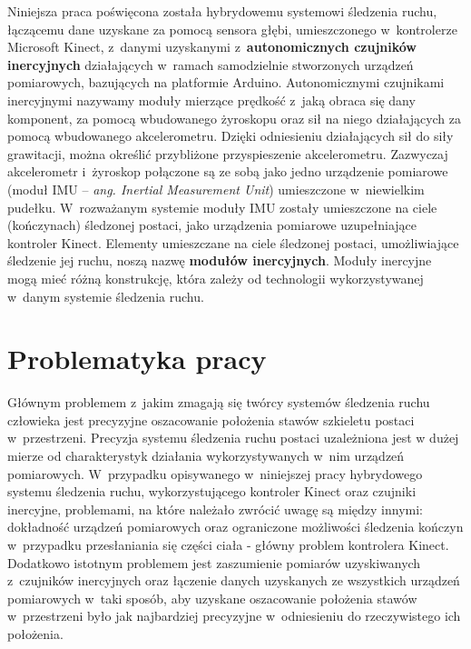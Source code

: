 Niniejsza praca poświęcona została hybrydowemu systemowi śledzenia ruchu, łączącemu dane uzyskane za pomocą sensora głębi, umieszczonego w~kontrolerze Microsoft Kinect, z~danymi uzyskanymi z~\textbf{autonomicznych czujników inercyjnych} działających w~ramach samodzielnie stworzonych urządzeń pomiarowych, bazujących na platformie Arduino. Autonomicznymi czujnikami inercyjnymi nazywamy moduły mierzące prędkość z~jaką obraca się dany komponent, za pomocą wbudowanego żyroskopu oraz sił na niego działających za pomocą wbudowanego akcelerometru. Dzięki odniesieniu działających sił do siły grawitacji, można określić przybliżone przyspieszenie akcelerometru.
Zazwyczaj akcelerometr i~żyroskop połączone są ze sobą jako jedno urządzenie pomiarowe (moduł IMU -- \emph{ang. Inertial Measurement Unit}) umieszczone w~niewielkim pudełku. W~rozważanym systemie moduły IMU zostały umieszczone na ciele (kończynach) śledzonej postaci, jako urządzenia pomiarowe uzupełniające kontroler Kinect. Elementy umieszczane na ciele śledzonej postaci, umożliwiające śledzenie jej ruchu, noszą nazwę \textbf{modułów inercyjnych}. Moduły inercyjne mogą mieć różną konstrukcję, która zależy od technologii wykorzystywanej w~danym systemie śledzenia ruchu.\\

\section{Problematyka pracy}
Głównym problemem z~jakim zmagają się twórcy systemów śledzenia ruchu człowieka jest precyzyjne oszacowanie położenia stawów szkieletu postaci w~przestrzeni. Precyzja systemu śledzenia ruchu postaci uzależniona jest w dużej mierze od charakterystyk działania wykorzystywanych w~nim urządzeń pomiarowych. W~przypadku opisywanego w~niniejszej pracy hybrydowego systemu śledzenia ruchu, wykorzystującego kontroler Kinect oraz czujniki inercyjne, problemami, na które należało zwrócić uwagę są między innymi: dokładność urządzeń pomiarowych oraz ograniczone możliwości śledzenia kończyn w~przypadku przesłaniania się części ciała - główny problem kontrolera Kinect. Dodatkowo istotnym problemem jest zaszumienie pomiarów uzyskiwanych z~czujników inercyjnych oraz łączenie danych uzyskanych ze wszystkich urządzeń pomiarowych w~taki sposób, aby uzyskane oszacowanie położenia stawów w~przestrzeni było jak najbardziej precyzyjne w~odniesieniu do rzeczywistego ich położenia.\\

